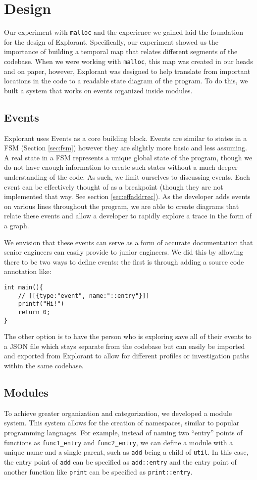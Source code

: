 \chapter{Design}
Our experiment with \texttt{malloc} and the experience we gained laid the foundation for the design of Explorant. Specifically, our experiment showed us the importance of building a temporal map that relates different segments of the codebase. When we were working with \texttt{malloc}, this map was created in our heads and on paper, however, Explorant was designed to help translate from important locations in the code to a readable state diagram of the program. To do this, we built a system that works on events organized inside modules.

\section{Events}
Explorant uses Events as a core building block. Events are similar to states in a FSM (Section \ref{sec:fsm}) however they are slightly more basic and less assuming. A real state in a FSM represents a unique global state of the program, though we do not have enough information to create such states without a much deeper understanding of the code. As such, we limit ourselves to discussing events. Each event can be effectively thought of as a breakpoint (though they are not implemented that way. See section \ref{sec:effaddrrec}). As the developer adds events on various lines throughout the program, we are able to create diagrams that relate these events and allow a developer to rapidly explore a trace in the form of a graph.

We envision that these events can serve as a form of accurate documentation that senior engineers can easily provide to junior engineers. We did this by allowing there to be two ways to define events: the first is through adding a source code annotation like: 
\begin{verbatim}
int main(){
    // [[{type:"event", name:"::entry"}]]
    printf("Hi!")
    return 0;
}
\end{verbatim}
The other option is to have the person who is exploring save all of their events to a JSON file which stays separate from the codebase but can easily be imported and exported from Explorant to allow for different profiles or investigation paths within the same codebase.


\section{Modules}
\label{sec:modules}
To achieve greater organization and categorization, we developed a module system. This system allows for the creation of namespaces, similar to popular programming languages. For example, instead of naming two ``entry'' points of functions as \texttt{func1\_entry} and \texttt{func2\_entry}, we can define a module with a unique name and a single parent, such as \texttt{add} being a child of \texttt{util}. In this case, the entry point of \texttt{add} can be specified as \texttt{add::entry} and the entry point of another function like \texttt{print} can be specified as \texttt{print::entry}. \\

